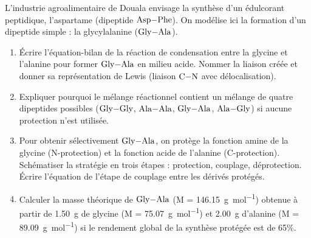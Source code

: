 \documentclass[11pt]{article}
\begin{document}
\begin{exercice}
L'industrie agroalimentaire de Douala envisage la synthèse d'un édulcorant peptidique, l'aspartame (dipeptide $\ce{Asp-Phe}$). On modélise ici la formation d'un dipeptide simple : la glycylalanine ($\ce{Gly-Ala}$).
\begin{enumerate}
    \item Écrire l'équation-bilan de la réaction de condensation entre la glycine et l'alanine pour former $\ce{Gly-Ala}$ en milieu acide. Nommer la liaison créée et donner sa représentation de Lewis (liaison $\ce{C-N}$ avec délocalisation).
    \item Expliquer pourquoi le mélange réactionnel contient un mélange de quatre dipeptides possibles ($\ce{Gly-Gly}$, $\ce{Ala-Ala}$, $\ce{Gly-Ala}$, $\ce{Ala-Gly}$) si aucune protection n'est utilisée. 
    \item Pour obtenir sélectivement $\ce{Gly-Ala}$, on protège la fonction amine de la glycine (N-protection) et la fonction acide de l'alanine (C-protection). Schématiser la stratégie en trois étapes : protection, couplage, déprotection. Écrire l'équation de l'étape de couplage entre les dérivés protégés.
    \item Calculer la masse théorique de $\ce{Gly-Ala}$ (M = \SI{146,15}{\gram\per\mole}) obtenue à partir de \SI{1,50}{\gram} de glycine (M = \SI{75,07}{\gram\per\mole}) et \SI{2,00}{\gram} d'alanine (M = \SI{89,09}{\gram\per\mole}) si le rendement global de la synthèse protégée est de 65\%.
\end{enumerate}
\end{exercice}
\end{document}
